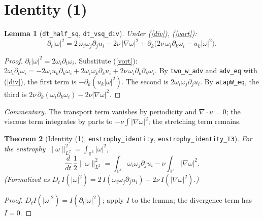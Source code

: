 \documentclass[11pt]{article}
\newtheorem{theorem}{Theorem}\newtheorem{lemma}[theorem]{Lemma}\theoremstyle{definition}\newtheorem{definition}[theorem]{Definition}
\begin{document}
\section{Identity (1)}
\begin{lemma}[\texttt{dt\_half\_sq}, \texttt{dt\_vsq\_div}]
Under (\ref{div}), (\ref{vort}):
\[\partial_t|\omega|^2=2\,\omega_i\omega_j\partial_ju_i-2\nu\,|\nabla\omega|^2
+\partial_k\big(2\nu\,\omega_i\partial_k\omega_i-u_k|\omega|^2\big).\]
\end{lemma}
\begin{proof}
$\partial_t|\omega|^2=2\omega_i\partial_t\omega_i$. Substitute (\ref{vort}):
$2\omega_i\partial_t\omega_i=-2\omega_iu_k\partial_k\omega_i+2\omega_i\omega_k\partial_ku_i+2\nu\,\omega_i\partial_k\partial_k\omega_i$.
By \texttt{two\_w\_adv} and \texttt{adv\_eq} with (\ref{div}), the first term is
$-\partial_k(u_k|\omega|^2)$. The second is $2\omega_i\omega_j\partial_ju_i$. By \texttt{wLapW\_eq},
the third is $2\nu\,\partial_k(\omega_i\partial_k\omega_i)-2\nu|\nabla\omega|^2$.
\end{proof}
\emph{Commentary.} The transport term vanishes by periodicity and $\nabla\cdot u=0$; the viscous
term integrates by parts to $-\nu\int|\nabla\omega|^2$; the stretching term remains.
\begin{theorem}[Identity (1), \texttt{enstrophy\_identity}, \texttt{enstrophy\_identity\_T3}]
For the enstrophy $\|\omega\|_{L^2}^2=\int_{\mathbb{T}^3}|\omega|^2$,
\[\frac{d}{dt}\,\frac12\|\omega\|_{L^2}^2=\int_{\mathbb{T}^3}\omega_i\omega_j\partial_ju_i-\nu\int_{\mathbb{T}^3}|\nabla\omega|^2 .\]
(Formalized as $D_t\,I(|\omega|^2)=2\,I(\omega_i\omega_j\partial_ju_i)-2\nu\,I(|\nabla\omega|^2)$.)
\end{theorem}
\begin{proof}$D_tI(|\omega|^2)=I(\partial_t|\omega|^2)$; apply $I$ to the lemma; the divergence
term has $I=0$.\end{proof}
\end{document}

